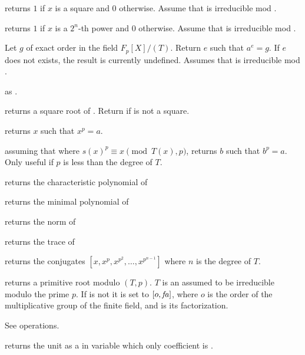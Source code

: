  returns $1$ if $x$ is a square
and $0$ otherwise. Assume that  is irreducible mod .

 returns $1$ if $x$ is
a $2^n$-th power and $0$ otherwise. Assume that  is irreducible mod
.

 Let $g$ of exact
order  in the field $F_p[X]/(T)$. Return $e$ such that $a^e=g$. If
$e$ does not exists, the result is currently undefined. Assumes that 
is irreducible mod .

 as
.

 returns a square root of .
Return  if  is not a square.

 returns $x$ such that $x^p = a$.

 assuming that
 where $s(x)^p \equiv x\pmod{T(x),p}$,
returns $b$ such that $b^p=a$. Only useful if $p$ is less than the degree of
$T$.

 returns the characteristic
polynomial of 

 returns the minimal polynomial
of 

 returns the norm of 

 returns the trace of 

 returns the conjugates
$[x,x^p,x^{p^2},\ldots,x^{p^{n-1}}]$ where $n$ is the degree of $T$.

 returns a primitive root modulo
$(T,p)$. $T$ is an  assumed to be irreducible modulo the prime
$p$. If  is not  it is set to $[o,\hbox{\it fa\/}]$, where $o$ is the
order of the multiplicative group of the finite field, and  is
its factorization.

 See  operations.

 returns the unit  as a
 in variable  which only coefficient is .

